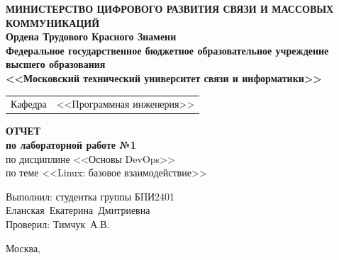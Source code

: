 \thispagestyle{empty}

\begin{center}
	\textbf{МИНИСТЕРСТВО ЦИФРОВОГО РАЗВИТИЯ СВЯЗИ И МАССОВЫХ КОММУНИКАЦИЙ} \\
	\textbf{Ордена Трудового Красного Знамени \\
	Федеральное государственное бюджетное образовательное учреждение высшего образования \\
	<<Московский технический университет связи и информатики>>}
\end{center}

\vspace{0.3em}

\begin{center}
	\begin{tabularx}{0.5\textwidth}{p{1.2cm}X}
		Кафедра & \quad <<Программная инженерия>> \\%
	\end{tabularx}
\end{center}

\vspace{12em}

\begin{center}
	\Large
	\textbf{ОТЧЕТ} \\
	\textbf{по лабораторной работе №1} \\
	\large
	по дисциплине <<Основы DevOps>> \\
	по теме <<Linux: базовое взаимодействие>>
\end{center}


\vspace{3em}

\begin{flushright}
	Выполнил: 
	студентка группы БПИ2401 \\
	Еланская~Екатерина~Дмитриевна\\
	Проверил: Тимчук~А.В.\\
\end{flushright}

\vspace{8em}

\begin{center}
	Москва,~\the\year
\end{center}
\clearpage

